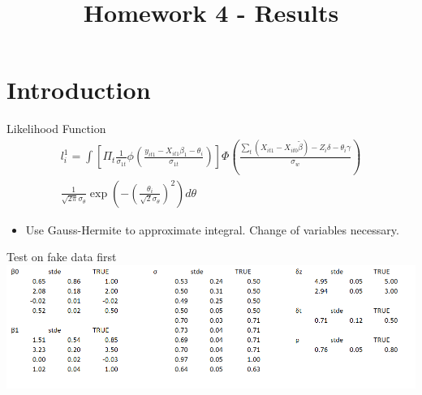 \documentclass{beamer}
\title{Homework 4 - Results}
\author{}
\institute[]{}
\begin{document}
\frame{
\titlepage
}

\section{Introduction}

\begin{frame}{Likelihood Function}
\begin{align}
l_i^1 = \int [\Pi_t \frac{1}{\sigma_{1t}} \phi(\frac{y_{it1} - X_{it1}\beta_1 - \theta_i}{\sigma_{1t}})]\Phi(\frac{\sum_t (X_{it1} - X_{it0}\tilde{\beta}) - Z_i \delta - \theta_i \gamma}{\sigma_w}) \\
 \frac{1}{\sqrt{2 \pi} \sigma_\theta} \exp(- (\frac{\theta_i}{\sqrt{2}\sigma_\theta})^2) d\theta
\end{align}
\begin{itemize}
\item Use Gauss-Hermite to approximate integral. Change of variables necessary.
\end{itemize}
\end{frame}

\begin{frame}{Test on fake data first}
\centering
\includegraphics[scale=0.55]{fake_est.png}
\end{frame}
\end{document}
